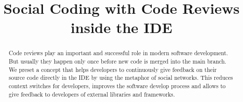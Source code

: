 \documentclass[10pt, conference]{IEEEtran}
\begin{document}
%
\title{Social Coding with Code Reviews inside the IDE}



\author{
}


% 



\maketitle


\begin{abstract}
Code reviews play an important and successful role in modern software development. 
%
But usually they happen only once before new code is merged into the main branch.
%
We preset a concept that helps developers to continuously give feedback on their source code directly in the IDE by using the metaphor of social networks. 
%
This reduces context switches for developers, improves the software develop process and allows to give feedback to developers of external libraries and frameworks. 
\end{abstract}
\end{document}
